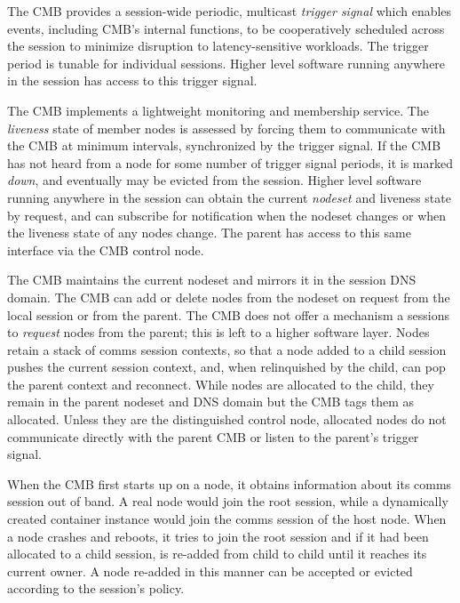 The CMB provides a session-wide periodic, multicast {\em trigger signal}
which enables events, including CMB's internal functions, to be cooperatively
scheduled across the session to minimize disruption to latency-sensitive
workloads.  The trigger period is tunable for individual sessions.
Higher level software running anywhere in the session has access to
this trigger signal.

The CMB implements a lightweight monitoring and membership service.
The {\em liveness} state of member nodes is assessed by forcing
them to communicate with the CMB at minimum intervals,
synchronized by the trigger signal.
If the CMB has not heard from a node for some number
of trigger signal periods, it is marked {\em down}, and eventually may
be evicted from the session.  Higher level software running anywhere in
the session can obtain the current {\em nodeset} and liveness state
by request, and can subscribe for notification when the nodeset changes
or when the liveness state of any nodes change.
The parent has access to this same interface via the CMB control node.

The CMB maintains the current nodeset and mirrors it in the session DNS
domain.  The CMB can add or delete nodes from the nodeset on request
from the local session or from the parent.  The CMB does not offer a
mechanism a sessions to {\em request} nodes from the parent; this
is left to a higher software layer.  Nodes retain a stack of comms
session contexts, so that a node added to a child session pushes the current
session context, and, when relinquished by the child, can pop the parent
context and reconnect.
While nodes are allocated to the child, they remain in the parent nodeset
and DNS domain but the CMB tags them as allocated.  Unless they are the
distinguished control node, allocated nodes do not communicate directly with
the parent CMB or listen to the parent's trigger signal.

When the CMB first starts up on a node, it obtains information about its
comms session out of band.
A real node would join the root session, while a dynamically created
container instance would join the comms session of the host node.
When a node crashes and reboots, it tries to join the root session and if
it had been allocated to a child session, is re-added from child to
child until it reaches its current owner.  A node re-added in this manner
can be accepted or evicted according to the session's policy.

